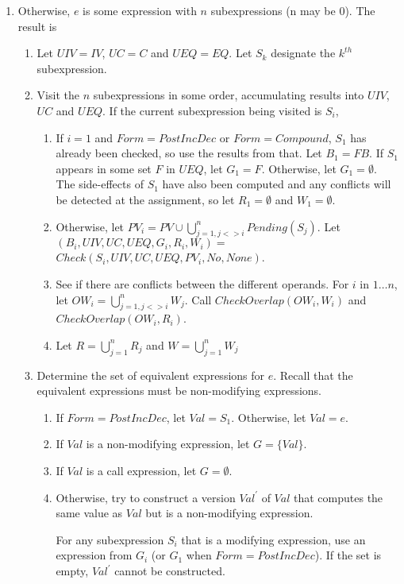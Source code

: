 \begin{enumerate}
\item Otherwise, $e$ is some expression with $n$ subexpressions (n may be 0).  The
result is 
\label{list:check-unordered-operands}
\begin{enumerate}
\item Let  $\mathit{UIV} = IV$, $\mathit{UC} = C$ and $UEQ = EQ$.  
        Let $S_k$ designate the $k^{th}$ subexpression.
\item Visit the $n$ subexpressions in some order, accumulating results into $\mathit{UIV}$, $\mathit{UC}$
         and $UEQ$.  If the current subexpression being visited is $S_i$,
\begin{enumerate}
\item If $i = 1$ and $Form = PostIncDec$ or $Form = Compound$, $S_1$ has already
been checked, so use the results from that.  Let $B_1 = FB$.  If $S_1$ appears in some set $F$ in $UEQ$,
 let $G_1 = F$. Otherwise, let $G_1 = \emptyset$.    The side-effects of $S_1$ have also
 been computed and any conflicts will be detected at the assignment, so let $R_1 = \emptyset$
 and $W_1 = \emptyset$.
\item Otherwise,  let $PV_i = PV \cup \bigcup_{j= 1, j <> i}^{n} Pending(S_j)$.
Let $(B_i, \mathit{UIV}, \mathit{UC}, UEQ, G_i, R_i, W_i) =$  
     $Check(S_i, \mathit{UIV}, \mathit{UC}, UEQ, PV_i, No, None)$.
\item See if there are conflicts between the different operands.  For $i$ in $1 \ldots n$,
let $OW_{i} = \bigcup_{j= 1, j <> i}^{n} W_j$. Call $CheckOverlap(OW_{i}, W_{i})$ and
$CheckOverlap(OW_{i}, R_{i})$.
\item Let $R = \bigcup_{j=1}^{n} R_j$ and $W = \bigcup_{j=1}^{n} W_j$
\end{enumerate}
\item Determine the set of equivalent expressions for $e$.  Recall that the equivalent expressions must be non-modifying expressions.
\begin{enumerate}
\item  If $Form = PostIncDec$, let $Val = S_1$.  Otherwise, let $Val = e$.
\item If $Val$ is a non-modifying expression, let $G  = \{ Val \}$.
\item If $Val$ is a call expression, let $G = \emptyset$.
\item Otherwise, try to construct a version $Val^\prime$ of $Val$ that computes the same value 
      as $Val$ but is a non-modifying expression. 
      
      For any subexpression $S_i$ that is a modifying expression, 
      use an expression from $G_i $ (or $G_1$ when $Form = PostIncDec$). If the set 
      is empty, $Val^\prime$ cannot be constructed.
      

\end{enumerate}
\end{enumerate}
\end{enumerate}
